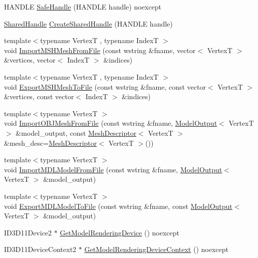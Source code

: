 \begin{DoxyCompactItemize}
\item 
H\+A\+N\+D\+LE \hyperlink{namespacemage_a71f22fac369f7eae4304255766252f5e}{Safe\+Handle} (H\+A\+N\+D\+LE handle) noexcept
\item 
\hyperlink{namespacemage_ae70b3368a2dccc985c4ecbdf15a1a3c9}{Shared\+Handle} \hyperlink{namespacemage_a3119898d7caac71d8ee495c3ae3194b1}{Create\+Shared\+Handle} (H\+A\+N\+D\+LE handle)
\item 
{\footnotesize template$<$typename VertexT , typename IndexT $>$ }\\void \hyperlink{namespacemage_ad98d571312abaaa2b0b7dd13958f5100}{Import\+M\+S\+H\+Mesh\+From\+File} (const wstring \&fname, vector$<$ VertexT $>$ \&vertices, vector$<$ IndexT $>$ \&indices)
\item 
{\footnotesize template$<$typename VertexT , typename IndexT $>$ }\\void \hyperlink{namespacemage_a6558ce42c284f76e6bb08bc0f9cabfc3}{Export\+M\+S\+H\+Mesh\+To\+File} (const wstring \&fname, const vector$<$ VertexT $>$ \&vertices, const vector$<$ IndexT $>$ \&indices)
\item 
{\footnotesize template$<$typename VertexT $>$ }\\void \hyperlink{namespacemage_abeaf36b602f5ed971b1b505e42972e4f}{Import\+O\+B\+J\+Mesh\+From\+File} (const wstring \&fname, \hyperlink{structmage_1_1_model_output}{Model\+Output}$<$ VertexT $>$ \&model\+\_\+output, const \hyperlink{structmage_1_1_mesh_descriptor}{Mesh\+Descriptor}$<$ VertexT $>$ \&mesh\+\_\+desc=\hyperlink{structmage_1_1_mesh_descriptor}{Mesh\+Descriptor}$<$ VertexT $>$())
\item 
{\footnotesize template$<$typename VertexT $>$ }\\void \hyperlink{namespacemage_a8eae2acc25c819aa8973e206a7b84b9f}{Import\+M\+D\+L\+Model\+From\+File} (const wstring \&fname, \hyperlink{structmage_1_1_model_output}{Model\+Output}$<$ VertexT $>$ \&model\+\_\+output)
\item 
{\footnotesize template$<$typename VertexT $>$ }\\void \hyperlink{namespacemage_a1e8cf202593cc54387c6d735220ffc0e}{Export\+M\+D\+L\+Model\+To\+File} (const wstring \&fname, const \hyperlink{structmage_1_1_model_output}{Model\+Output}$<$ VertexT $>$ \&model\+\_\+output)
\item 
I\+D3\+D11\+Device2 $\ast$ \hyperlink{namespacemage_abe853bf4c3fee4be87be306f04e66ba3}{Get\+Model\+Rendering\+Device} () noexcept
\item 
I\+D3\+D11\+Device\+Context2 $\ast$ \hyperlink{namespacemage_a32622fbfff97a28a659f80eb0e1e1d00}{Get\+Model\+Rendering\+Device\+Context} () noexcept

\end{DoxyCompactItemize}
